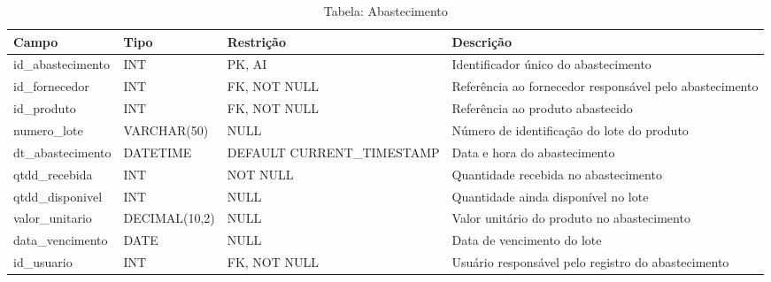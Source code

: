 \begin{table}[H]
\centering
\begin{tabular}{|p{3cm}|p{3cm}|p{3cm}|p{5cm}|}
\hline
\textbf{Campo} & \textbf{Tipo} & \textbf{Restrição} & \textbf{Descrição} \\ \hline
id\_abastecimento & INT & PK, AI & Identificador único do abastecimento \\ \hline
id\_fornecedor & INT & FK, NOT NULL & Referência ao fornecedor responsável pelo abastecimento \\ \hline
id\_produto & INT & FK, NOT NULL & Referência ao produto abastecido \\ \hline
numero\_lote & VARCHAR(50) & NULL & Número de identificação do lote do produto \\ \hline
dt\_abastecimento & DATETIME & DEFAULT CURRENT\_TIMESTAMP & Data e hora do abastecimento \\ \hline
qtdd\_recebida & INT & NOT NULL & Quantidade recebida no abastecimento \\ \hline
qtdd\_disponivel & INT & NULL & Quantidade ainda disponível no lote \\ \hline
valor\_unitario & DECIMAL(10,2) & NULL & Valor unitário do produto no abastecimento \\ \hline
data\_vencimento & DATE & NULL & Data de vencimento do lote \\ \hline
id\_usuario & INT & FK, NOT NULL & Usuário responsável pelo registro do abastecimento \\ \hline
\end{tabular}
\caption{Tabela: Abastecimento}
\end{table}